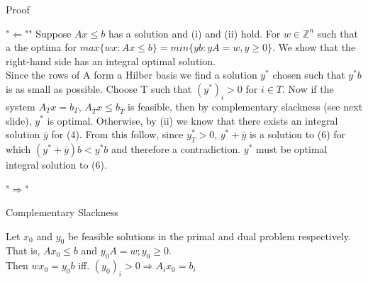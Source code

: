 \documentclass{beamer}
\begin{document}
\begin{frame}{Proof}
	
	\begin{block}{"$\Leftarrow$""}  %
		\small
		Suppose $Ax\leq b$ has a solution and (i) and (ii) hold. For $w\in \mathbb{Z}^n$ such that a the optima for $max\{wx:Ax\leq b\}=min\{yb: yA=w, y\geq 0 \}$. We show that the right-hand side has an integral optimal solution.\\

		Since the rows of A form a Hilber basis we find a solution $y^*$ chosen such that $y^* b$ is as small as possible. Choose T such that $(y^*)_i>0$ for $i\in T$. Now if the system $A_T x= b_T$, $A_{\bar{T}}x\leq b_{\bar{T}}$ is feasible, then by complementary slackness (see next slide), $y^*$ is optimal. Otherwise, by (ii) we know that there exists an integral solution $\bar{y}$ for (4). From this follow, since $y_T^* > 0$, $y^* + \bar{y}$ is a solution to (6) for which $(y^*+\bar{y})b < y^* b$ and therefore a contradiction. $y^*$ must be optimal integral solution to (6).

	\end{block}

\end{frame}

\begin{frame}

	\begin{block}{"$\Rightarrow$"}



	\end{block}

\end{frame}


\begin{frame}  %

	\begin{block}{Complementary Slackness}

		Let $x_0$ and $y_0$ be feasible solutions in the primal and dual problem respectively.
		That is, $Ax_0 \leq b$ and $y_0 A = w; y_0 \geq 0$. \\
		Then $w x_0 = y_0 b$ iff. $(y_0)_i > 0  \Rightarrow A_i x_0 = b_i$

	\end{block}	

\end{frame}

\end{document}
